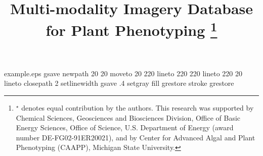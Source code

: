 %
%
%
%
%
\begin{filecontents*}{example.eps}
gsave
newpath
  20 20 moveto
  20 220 lineto
  220 220 lineto
  220 20 lineto
closepath
2 setlinewidth
gsave
  .4 setgray fill
grestore
stroke
grestore
\end{filecontents*}
%
\RequirePackage{fix-cm}
%
\documentclass[twocolumn]{svjour3}          %
%
\smartqed  %
%
\usepackage{bm}
\usepackage{graphicx}
\usepackage{epstopdf}
\usepackage{color}
\usepackage{multirow}
\usepackage{tabularx}
\usepackage[misc,geometry]{ifsym}
\usepackage{threeparttable}


%
%
%
%
%
\sloppy


\title{Multi-modality Imagery Database for Plant Phenotyping \thanks{$^\star$ denotes equal contribution by the authors. This research was supported by Chemical Sciences, Geosciences and Biosciences Division, Office of Basic Energy Sciences, Office of Science, U.S. Department of Energy (award number DE-FG02-91ER20021), and by Center for Advanced Algal and Plant Phenotyping (CAAPP), Michigan State University.
}
}

